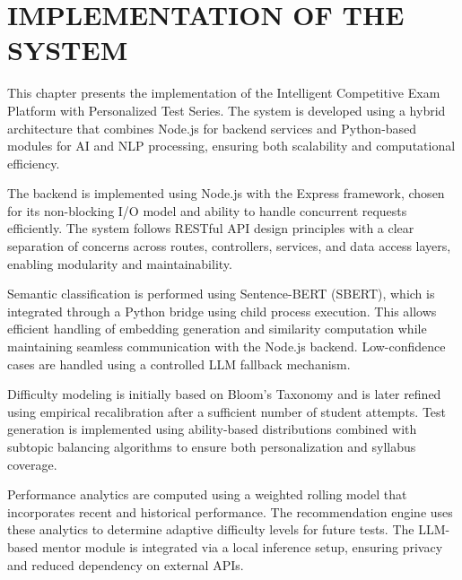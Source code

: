 \chapter{\MakeUppercase{IMPLEMENTATION OF THE SYSTEM}}
\begin{sloppypar}
\newcommand{\algoheader}[2]{\par\vspace{0.15em}\noindent\rule{\textwidth}{0.4pt}\\[-0.45em]\textbf{Algorithm #1} #2\\[-0.45em]\noindent\rule{\textwidth}{0.4pt}\\[-0.05em]}
\newcommand{\algofooter}{\par\noindent\rule{\textwidth}{0.4pt}\\[0.25em]}

This chapter presents the implementation of the Intelligent Competitive Exam Platform with Personalized Test Series. The system is developed using a hybrid architecture that combines Node.js for backend services and Python-based modules for AI and NLP processing, ensuring both scalability and computational efficiency.

The backend is implemented using Node.js with the Express framework, chosen for its non-blocking I/O model and ability to handle concurrent requests efficiently. The system follows RESTful API design principles with a clear separation of concerns across routes, controllers, services, and data access layers, enabling modularity and maintainability.

Semantic classification is performed using Sentence-BERT (SBERT), which is integrated through a Python bridge using child process execution. This allows efficient handling of embedding generation and similarity computation while maintaining seamless communication with the Node.js backend. Low-confidence cases are handled using a controlled LLM fallback mechanism.

Difficulty modeling is initially based on Bloom's Taxonomy and is later refined using empirical recalibration after a sufficient number of student attempts. Test generation is implemented using ability-based distributions combined with subtopic balancing algorithms to ensure both personalization and syllabus coverage.

Performance analytics are computed using a weighted rolling model that incorporates recent and historical performance. The recommendation engine uses these analytics to determine adaptive difficulty levels for future tests. The LLM-based mentor module is integrated via a local inference setup, ensuring privacy and reduced dependency on external APIs.


\end{sloppypar}

